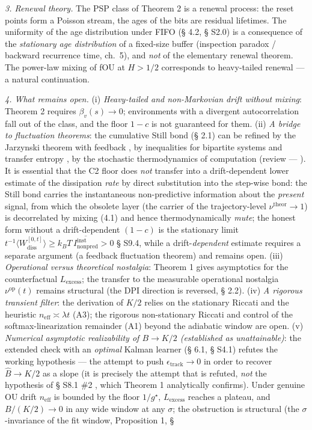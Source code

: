 \documentclass[12pt]{iopart}
\begin{document}
\emph{3. Renewal theory.} The PSP class of Theorem 2 is a renewal process: the reset points form a Poisson stream, the ages of the bits are residual lifetimes. The uniformity of the age distribution under FIFO (§ 4.2, § S2.0) is a consequence of the \emph{stationary age distribution} of a fixed-size buffer (inspection paradox / backward recurrence time, \cite{Cox1962} ch.~5), and \emph{not} of the elementary renewal theorem. The power-law mixing of fOU at \(H > 1/2\) corresponds to heavy-tailed renewal --- a natural continuation.



\emph{4. What remains open.} (i) \emph{Heavy-tailed and non-Markovian drift without mixing}: Theorem 2 requires \(\beta_v(s) \to 0\); environments with a divergent autocorrelation fall out of the class, and the floor \(1-c\) is not guaranteed for them. (ii) \emph{A bridge to fluctuation theorems}: the cumulative Still bond (§ 2.1) can be refined by the Jarzynski theorem with feedback \cite{SagawaUeda2010}, by inequalities for bipartite systems and transfer entropy \cite{HartichBaratoSeifert2014}, by the stochastic thermodynamics of computation \cite{Wolpert2019} (review --- \cite{Parrondo2015}). It is essential that the C2 floor does \emph{not} transfer into a drift-dependent lower estimate of the dissipation \emph{rate} by direct substitution into the step-wise bond: the Still bond carries the instantaneous non-predictive information about the \emph{present} signal, from which the obsolete layer (the carrier of the trajectory-level \(\nu^{\text{theor}}\to1\)) is decorrelated by mixing (4.1) and hence thermodynamically \emph{mute}; the honest form without a drift-dependent \((1-c)\) is the stationary limit \(t^{-1}\langle W_{\text{diss}}^{[0,t]}\rangle \ge k_B T\,\overline{I_{\text{nonpred}}^{\text{inst}}} > 0\) \cite{Andriishin2026b} § S9.4, while a drift-\emph{dependent} estimate requires a separate argument (a feedback fluctuation theorem) and remains open. (iii) \emph{Operational versus theoretical nostalgia}: Theorem 1 gives asymptotics for the counterfactual \(L_{\text{excess}}\); the transfer to the measurable operational nostalgia \(\nu^{\text{op}}(t)\) remains structural (the DPI direction is reversed, § 2.2). (iv) \emph{A rigorous transient filter}: the derivation of \(K/2\) relies on the stationary Riccati and the heuristic \(n_{\text{eff}} \asymp \lambda t\) (A3); the rigorous non-stationary Riccati and control of the softmax-linearization remainder (A1) beyond the adiabatic window are open. (v) \emph{Numerical asymptotic realizability of \(B \to K/2\) (established as unattainable)}: the extended check with an \emph{optimal} Kalman learner (§ 6.1, § S4.1) refutes the working hypothesis --- the attempt to push \(\epsilon_{\text{track}} \to 0\) in order to recover \(\hat B \to K/2\) as a slope (it is precisely the attempt that is refuted, \emph{not} the hypothesis of § S8.1 \#2 \cite{Andriishin2026b}, which Theorem 1 analytically confirms). Under genuine OU drift \(n_{\text{eff}}\) is bounded by the floor \(1/g^\star\), \(L_{\text{excess}}\) reaches a plateau, and \(B/(K/2) \to 0\) in any wide window at any \(\sigma\); the obstruction is structural (the \(\sigma\)-invariance of the fit window, Proposition 1, § 
\end{document}
